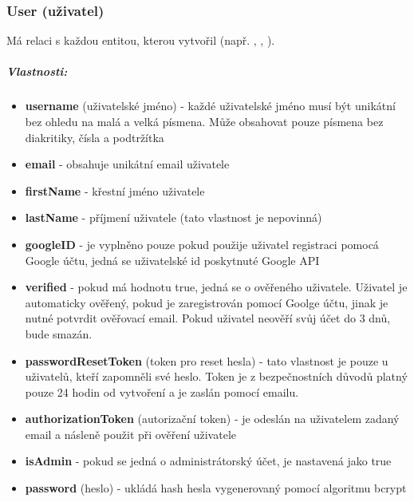 \documentclass[12pt, a4paper,
 twoside,        %
 openright
]{report}
\newenvironment{propertiesItemize}{
\begin{itemize}{ 
  }}
  {\end{itemize}}
\begin{document}
    	            \subsubsection{User (uživatel)}  Má relaci  s každou entitou, kterou vytvořil (např. , , ).
                         \subparagraph{Vlastnosti:}  
                           \begin{propertiesItemize}
                                \item \textbf{username} (uživatelské jméno) - každé uživatelské jméno musí být unikátní bez ohledu na malá a velká písmena. Může obsahovat pouze písmena bez diakritiky, čísla a podtržítka
                                \item \textbf{email} - obsahuje unikátní email uživatele
                                \item \textbf{firstName} - křestní jméno uživatele
                                \item \textbf{lastName} - příjmení uživatele (tato vlastnost je nepovinná)
                                \item \textbf{googleID} - je vyplněno pouze pokud použije uživatel registraci pomocá Google účtu, jedná se uživatelské id poskytnuté Google API 
                                \item \textbf{verified} - pokud má hodnotu true, jedná se o ověřeného uživatele. Uživatel je automaticky ověřený, pokud je zaregistrován pomocí Goolge účtu, jinak je nutné potvrdit ověřovací email. Pokud uživatel neověří svůj účet do 3 dnů, bude smazán. 
                                \item \textbf{passwordResetToken} (token pro reset hesla) - tato vlastnost je pouze u uživatelů, kteří zapomněli své heslo. Token je z bezpečnostních důvodů platný pouze 24 hodin od vytvoření a je zaslán pomocí emailu.  
                                \item \textbf{authorizationToken} (autorizační token) - je odeslán na uživatelem zadaný email a násleně použit při ověření uživatele
                                \item \textbf{isAdmin} - pokud se jedná o administrátorský účet, je nastavená jako true
                                \item \textbf{password} (heslo) - ukládá hash hesla vygenerovaný pomocí algoritmu bcrypt
                        \end{propertiesItemize}
\end{document}
